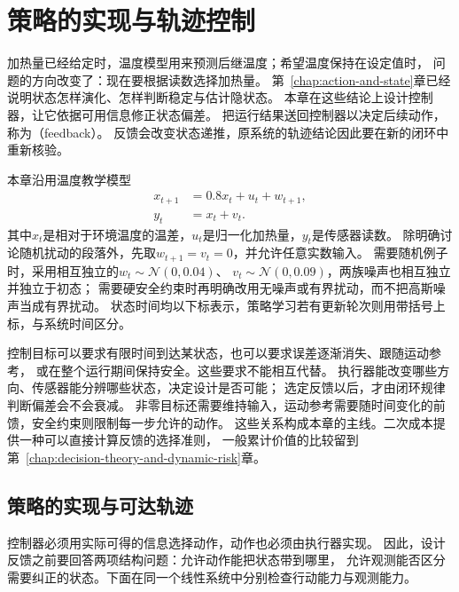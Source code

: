 \chapter{策略的实现与轨迹控制}
\label{chap:control-theory}
\label{chap:policy-realization-and-control}

加热量已经给定时，温度模型用来预测后继温度；希望温度保持在设定值时，
问题的方向改变了：现在要根据读数选择加热量。
第~\ref{chap:action-and-state}章已经说明状态怎样演化、怎样判断稳定与估计隐状态。
本章在这些结论上设计控制器，让它依据可用信息修正状态偏差。
把运行结果送回控制器以决定后续动作，称为（feedback）。
反馈会改变状态递推，原系统的轨迹结论因此要在新的闭环中重新核验。

本章沿用温度教学模型
\begin{equation}
  \begin{aligned}
    x_{t+1}&=0.8x_t+u_t+w_{t+1},\\
    y_t&=x_t+v_t.
  \end{aligned}
  \label{eq:control-temperature-model}
\end{equation}
其中$x_t$是相对于环境温度的温差，$u_t$是归一化加热量，$y_t$是传感器读数。
除明确讨论随机扰动的段落外，先取$w_{t+1}=v_t=0$，并允许任意实数输入。
需要随机例子时，采用相互独立的$w_t\sim\mathcal N(0,0.04)$、
$v_t\sim\mathcal N(0,0.09)$，两族噪声也相互独立并独立于初态；
需要硬安全约束时再明确改用无噪声或有界扰动，而不把高斯噪声当成有界扰动。
状态时间均以下标表示，策略学习若有更新轮次则用带括号上标，与系统时间区分。

控制目标可以要求有限时间到达某状态，也可以要求误差逐渐消失、跟随运动参考，
或在整个运行期间保持安全。这些要求不能相互代替。
执行器能改变哪些方向、传感器能分辨哪些状态，决定设计是否可能；
选定反馈以后，才由闭环规律判断偏差会不会衰减。
非零目标还需要维持输入，运动参考需要随时间变化的前馈，安全约束则限制每一步允许的动作。
这些关系构成本章的主线。二次成本提供一种可以直接计算反馈的选择准则，
一般累计价值的比较留到第~\ref{chap:decision-theory-and-dynamic-risk}章。

\section{策略的实现与可达轨迹}
\label{sec:control-feedback-structure}

控制器必须用实际可得的信息选择动作，动作也必须由执行器实现。
因此，设计反馈之前要回答两项结构问题：允许动作能把状态带到哪里，
允许观测能否区分需要纠正的状态。下面在同一个线性系统中分别检查行动能力与观测能力。

